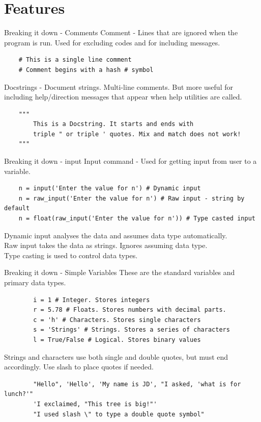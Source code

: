 \documentclass[10pt]{beamer}
\begin{document}
\section{Features}
\begin{frame}[fragile]{Breaking it down - Comments}
Comment - Lines that are ignored when the program is run. Used for excluding codes and for including messages.
	\begin{lstlisting}
	# This is a single line comment
	# Comment begins with a hash # symbol
	\end{lstlisting}
Docstrings - Document strings. Multi-line comments. But more useful for including help/direction messages that appear when help utilities are called.
	\begin{lstlisting}
	"""
	    This is a Docstring. It starts and ends with 
	    triple " or triple ' quotes. Mix and match does not work!
	"""
	\end{lstlisting}
\end{frame}

\begin{frame}[fragile]{Breaking it down - input}
Input command - Used for getting input from user to a variable.
	\begin{lstlisting}
	n = input('Enter the value for n') # Dynamic input
	n = raw_input('Enter the value for n') # Raw input - string by default
	n = float(raw_input('Enter the value for n')) # Type casted input
	\end{lstlisting}
Dynamic input analyses the data and assumes data type automatically. \\
Raw input takes the data as strings. Ignores assuming data type. \\
Type casting is used to control data types.
\end{frame}

\begin{frame}[fragile]{Breaking it down - Simple Variables}
These are the standard variables and primary data types.

	\begin{lstlisting}
		i = 1 # Integer. Stores integers
		r = 5.78 # Floats. Stores numbers with decimal parts.
		c = 'h' # Characters. Stores single characters
		s = 'Strings' # Strings. Stores a series of characters
		l = True/False # Logical. Stores binary values
	\end{lstlisting}
	Strings and characters use both single and double quotes, but must end accordingly. Use slash to place quotes if needed.
	\begin{lstlisting}
		"Hello", 'Hello', 'My name is JD', "I asked, 'what is for lunch?'"
		'I exclaimed, "This tree is big!"'
		"I used slash \" to type a double quote symbol"
	\end{lstlisting}

\end{frame}
\end{document}
